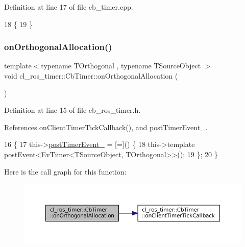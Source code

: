 Definition at line 17 of file cb\+\_\+timer.\+cpp.


\begin{DoxyCode}
18 \{
19 \}
\end{DoxyCode}
\mbox{\label{classcl__ros__timer_1_1CbTimer_a517d01e1fc44729db8fcd347f17c414f}} 
\subsubsection{\texorpdfstring{on\+Orthogonal\+Allocation()}{onOrthogonalAllocation()}}
{\footnotesize\ttfamily template$<$typename T\+Orthogonal , typename T\+Source\+Object $>$ \\
void cl\+\_\+ros\+\_\+timer\+::\+Cb\+Timer\+::on\+Orthogonal\+Allocation (\begin{DoxyParamCaption}{ }\end{DoxyParamCaption})\hspace{0.3cm}{\ttfamily [inline]}}



Definition at line 15 of file cb\+\_\+ros\+\_\+timer.\+h.



References on\+Client\+Timer\+Tick\+Callback(), and post\+Timer\+Event\+\_\+.


\begin{DoxyCode}
16   \{
17     this->\hyperlink{classcl__ros__timer_1_1CbTimer_ad2b7913a84459d635fdcca8d346c7af2}{postTimerEvent\_} = [=]() \{
18       this->\textcolor{keyword}{template} postEvent<EvTimer<TSourceObject, TOrthogonal>>();
19     \};
20   \}
\end{DoxyCode}
Here is the call graph for this function\+:
\nopagebreak
\begin{figure}[H]
\begin{center}
\leavevmode
\includegraphics[width=350pt]{classcl__ros__timer_1_1CbTimer_a517d01e1fc44729db8fcd347f17c414f_cgraph}
\end{center}
\end{figure}


